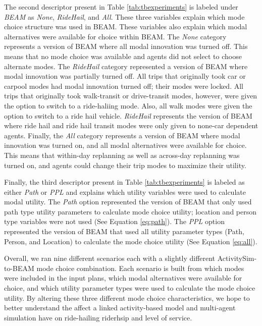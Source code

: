 \documentclass[fancy, masters]{byuthesis}
\begin{document}
The second descriptor present in Table \ref{tab:tbexperiments} is labeled under \emph{BEAM} as \emph{None}, \emph{RideHail}, and \emph{All}. These three variables explain which mode choice structure was used in BEAM. These variables also explain which modal alternatives were available for choice within BEAM. The \emph{None} category represents a version of BEAM where all modal innovation was turned off. This means that no mode choice was available and agents did not select to choose alternate modes. The \emph{RideHail} category represented a version of BEAM where modal innovation was partially turned off. All trips that originally took car or carpool modes had modal innovation turned off; their modes were locked. All trips that originally took walk-transit or drive-transit modes, however, were given the option to switch to a ride-haliing mode. Also, all walk modes were given the option to switch to a ride hail vehicle. \emph{RideHail} represents the version of BEAM where ride hail and ride hail transit modes were only given to none-car dependent agents. Finally, the \emph{All} category represents a version of BEAM where modal innovation was turned on, and all modal alternatives were available for choice. This means that within-day replanning as well as across-day replanning was turned on, and agents could change their trip modes to maximize their utility.

Finally, the third descriptor present in Table \ref{tab:tbexperiments} is labeled as either \emph{Path} or \emph{PPL} and explains which utility variables were used to calculate modal utility. The \emph{Path} option represented the version of BEAM that only used path type utility parameters to calculate mode choice utility; location and person type variables were not used (See Equation \eqref{eq:path}). The \emph{PPL} option represented the version of BEAM that used all utility parameter types (Path, Person, and Location) to calculate the mode choice utility (See Equation \eqref{eq:all}).

Overall, we ran nine different scenarios each with a slightly different ActivitySim-to-BEAM mode choice combination. Each scenario is built from which modes were included in the input plans, which modal alternatives were available for choice, and which utility parameter types were used to calculate the mode choice utility. By altering these three different mode choice characteristics, we hope to better understand the affect a linked activity-based model and multi-agent simulation have on ride-hailing riderhsip and level of service.
\end{document}
